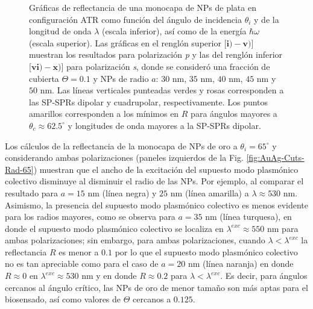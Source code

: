 \begin{figure}[h!]
\vspace*{-.5em}
	\caption{Gráficas de reflectancia de una monocapa de NPs de plata en configuración ATR como función del ángulo de incidencia $\theta_i$ y de la longitud de onda $\lambda$ (escala inferior), así como de la energía  $\hbar\omega$ (escala superior).  Las gráficas   en el renglón superior [$\mathbf{i)-v)}$] muestran los resultados para  polarización \emph{p} y las del renglón inferior  [$\mathbf{vi)-x)}$]  para polarización  \emph{s}, donde se consideró una fracción de cubierta $\Theta = 0.1$ y  NPs de radio  $a$: $30$ nm, $35$ nm, $40$ nm, $45$ nm y $50$ nm.  Las líneas verticales punteadas verdes y rosas corresponden a las SP-SPRs dipolar y  cuadrupolar, respectivamente.  Los puntos amarillos corresponden a los mínimos en $R$ para ángulos mayores a $\theta_c\approx 62.5^\circ$ y longitudes de onda mayores a la SP-SPRs dipolar.
}	\label{fig:Ag-R-Rad}	
	\end{figure}	

Los cálculos de la reflectancia de la monocapa de NPs de oro a $\theta_i=65^\circ$ y considerando ambas polarizaciones (paneles izquierdos de la Fig. \ref{fig:AuAg-Cuts-Rad-65}) muestran que el ancho de la excitación del supuesto modo plasmónico colectivo disminuye  al disminuir el radio de las NPs. Por ejemplo, al comparar el resultado para $a=15$ nm (línea negra) y $25$ nm (línea amarilla) a $\lambda\approx 530$ nm. Asimismo, la presencia del supuesto modo plasmónico colectivo es menos evidente para los radios mayores, como se observa para $a=35$ nm (línea turquesa), en donde el supuesto modo plasmónico colectivo  se localiza en $\lambda^{exc}\approx 550$ nm para ambas polarizaciones; sin embargo, para ambas polarizaciones, cuando $\lambda<\lambda^{exc}$ la reflectancia $R$ es menor a $0.1$ por lo que el supuesto modo plasmónico colectivo no es tan apreciable como para el caso de $a=20$ nm (línea naranja) en donde $R\approx 0$ en $\lambda^{exc}\approx 530$ nm y en donde  $R\approx 0.2$ para $\lambda<\lambda^{exc}$. Es decir, para ángulos cercanos al ángulo crítico, las NPs de oro de menor tamaño son más aptas para el biosensado, así como valores de $\Theta$ cercanos a $0.125$.


